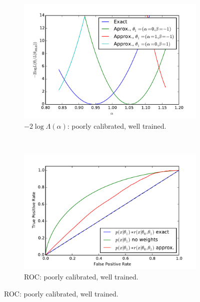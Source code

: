 \documentclass[12pt]{article}
\numberwithin{equation}{section}
\theoremstyle{plain}
\begin{document}
\begin{figure}
    \begin{subfigure}[t]{0.4\textwidth}
        \centering
        \includegraphics[width=\textwidth]{figures/likelihood_comp_1.pdf}
        \caption{$-2\log \Lambda(\alpha)$: poorly calibrated, well trained. }
        \label{fig:6c}
    \end{subfigure}
    ~
    \begin{subfigure}[t]{0.4\textwidth}
        \centering
        \includegraphics[width=\textwidth]{figures/ROC_comp1.pdf}
        \caption{ROC: poorly calibrated, well trained. }
        \label{fig:6d}
    \end{subfigure}


\end{figure}
\end{document}
